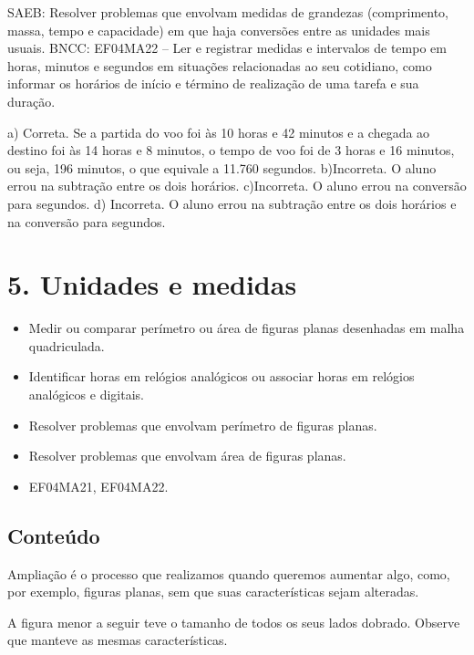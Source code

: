 \begin{enumerate}
\begin{escolha}
\begin{enumerate}
\begin{itemize}
\begin{itemize}
\begin{escolha}
SAEB: Resolver problemas que envolvam medidas de grandezas (comprimento, massa, tempo e capacidade) em que haja conversões entre as unidades mais usuais.
BNCC: EF04MA22 -- Ler e registrar medidas e intervalos de tempo em horas, minutos e segundos em
situações relacionadas ao seu cotidiano, como informar os horários de início e término de realização
de uma tarefa e sua duração.

a) Correta. Se a partida do voo foi às 10 horas e 42 minutos e a chegada ao destino foi às 14 horas e 8 minutos, o tempo de voo foi de 3 horas e 16 minutos, ou seja, 196 minutos, o que equivale a 11.760 segundos.
b)Incorreta. O aluno errou na subtração entre os dois horários.
c)Incorreta. O aluno errou na conversão para segundos.
d) Incorreta. O aluno errou na subtração entre os dois horários e na conversão para segundos.


\section{5. Unidades e medidas}\label{muxf3dulo-5}


\begin{itemize}
\item Medir ou comparar perímetro ou área de figuras planas desenhadas em
malha quadriculada.
\item Identificar horas em relógios analógicos ou associar horas em relógios
analógicos e digitais.
\item Resolver problemas que envolvam perímetro de figuras planas.
\item Resolver problemas que envolvam área de figuras planas.
\end{itemize}


\begin{itemize}
\item EF04MA21, EF04MA22.
\end{itemize}

\subsection{Conteúdo}\label{conteuxfado-4}
Ampliação é o processo que realizamos quando queremos aumentar algo,
como, por exemplo, figuras planas, sem que suas características
sejam alteradas.

A figura menor a seguir teve o tamanho de todos os seus lados dobrado. Observe que manteve as mesmas
características.


\end{escolha}
\end{itemize}
\end{itemize}
\end{enumerate}
\end{escolha}
\end{enumerate}
